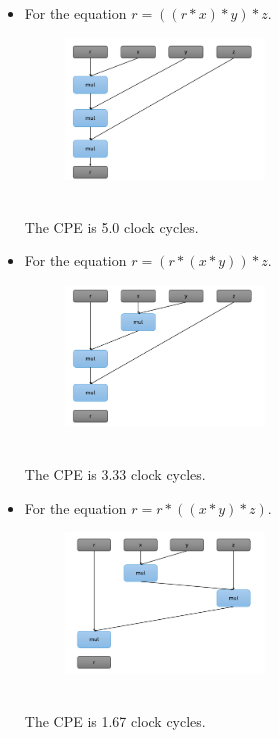 \documentclass{article}
\begin{document}
\begin{itemize}
	\item For the equation $r = ((r*x)*y)*z$. \\
	\begin{figure}[h]
		\centering
		\includegraphics[width=0.5\textwidth]{fig1}
	\end{figure} \\
	The CPE is 5.0 clock cycles.
	\item For the equation $r = (r*(x*y))*z$. \\
	\begin{figure}[h]
		\centering
		\includegraphics[width=0.5\textwidth]{fig2}
	\end{figure} \\
	The CPE is 3.33 clock cycles.
	\item For the equation $r = r*((x*y)*z)$. \\
	\begin{figure}[h]
		\centering
		\includegraphics[width=0.5\textwidth]{fig3}
	\end{figure} \\
	The CPE is 1.67 clock cycles.

\end{itemize}
\end{document}
